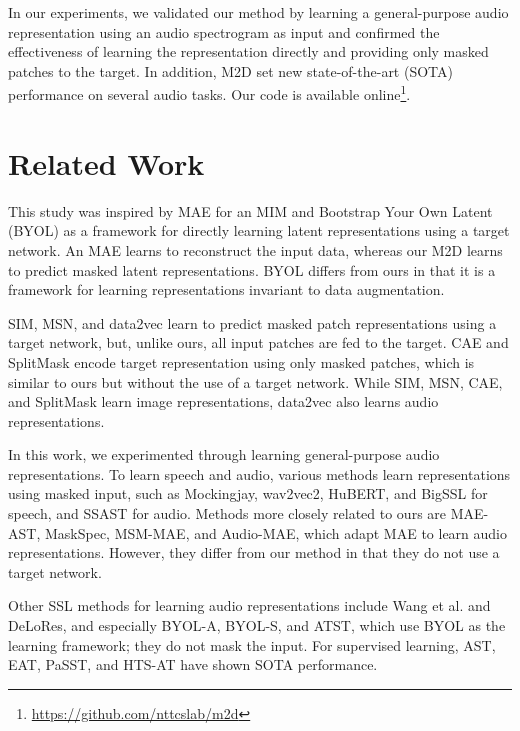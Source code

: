 \documentclass{article}
\begin{document}
In our experiments, we validated our method by learning a general-purpose audio representation using an audio spectrogram as input and confirmed the effectiveness of learning the representation directly and providing only masked patches to the target. In addition, M2D set new state-of-the-art (SOTA) performance on several audio tasks.
Our code is available online\footnote{\url{https://github.com/nttcslab/m2d}}.


\section{Related Work}
This study was inspired by MAE\cite{he2022masked} for an MIM and Bootstrap Your Own Latent\cite{grill2020byol} (BYOL) as a framework for directly learning latent representations using a target network.
An MAE learns to reconstruct the input data, whereas our M2D learns to predict masked latent representations.
BYOL differs from ours in that it is a framework for learning representations invariant to data augmentation.

SIM\cite{tao2022MIM:SIM}, MSN\cite{assran2022MIM:MSN}, and data2vec\cite{baevski2022data2vec} learn to predict masked patch representations using a target network, but, unlike ours, all input patches are fed to the target.
CAE\cite{chen2022MIM:CAE} and SplitMask\cite{elnouby2021MIM:SplitMask} encode target representation using only masked patches, which is similar to ours but without the use of a target network.
While SIM, MSN, CAE, and SplitMask learn image representations, data2vec also learns audio representations. 

In this work, we experimented through learning general-purpose audio representations.
To learn speech and audio, various methods learn representations using masked input, such as Mockingjay\cite{Liu2020Mockingjay}, wav2vec2\cite{baevski2020wav2vec2}, HuBERT\cite{Hsu2021HuBERT}, and BigSSL\cite{zhang2021bigssl} for speech, and SSAST\cite{gong2022ssast} for audio.
Methods more closely related to ours are MAE-AST\cite{Baade2022MAE-AST}, MaskSpec\cite{chong2022maskspec}, MSM-MAE\cite{niizumi2022msm-mae}, and Audio-MAE\cite{huang2022maskedlisten}, which adapt MAE to learn audio representations. However, they differ from our method in that they do not use a target network.

Other SSL methods for learning audio representations include Wang et al.\cite{wang2022universal} and DeLoRes\cite{Ghosh2022DeLoRes}, and especially BYOL-A\cite{niizumi2022byol-a}, BYOL-S\cite{scheidwasserclow2021serab}, and ATST\cite{Li2022ATST}, which use BYOL as the learning framework; they do not mask the input.
For supervised learning, AST\cite{gong2021ast}, EAT\cite{gazneli2022EAT}, PaSST\cite{Koutini2022passt}, and HTS-AT\cite{Chen2022HTS-AT} have shown SOTA performance.
\end{document}
